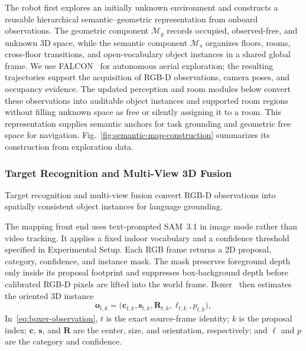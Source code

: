 \documentclass[letterpaper,10pt,journal]{IEEEtran}
\begin{document}
The robot first explores an initially unknown environment and constructs a reusable hierarchical semantic--geometric representation from onboard observations. The geometric component $\mathcal M_g$ records occupied, observed-free, and unknown 3D space, while the semantic component $\mathcal M_s$ organizes floors, rooms, cross-floor transitions, and open-vocabulary object instances in a shared global frame. We use FALCON~\cite{zhang2024falcon} for autonomous aerial exploration; the resulting trajectories support the acquisition of RGB-D observations, camera poses, and occupancy evidence. The updated perception and room modules below convert these observations into auditable object instances and supported room regions without filling unknown space as free or silently assigning it to a room. This representation supplies semantic anchors for task grounding and geometric free space for navigation. Fig.~\ref{fig:semantic-map-construction} summarizes its construction from exploration data.

\subsubsection{Target Recognition and Multi-View 3D Fusion}

Target recognition and multi-view fusion convert RGB-D observations into spatially consistent object instances for language grounding.

The mapping front end uses text-prompted SAM~3.1 in image mode rather than video tracking. It applies a fixed indoor vocabulary and a confidence threshold specified in Experimental Setup. Each RGB frame returns a 2D proposal, category, confidence, and instance mask. The mask preserves foreground depth only inside its proposal footprint and suppresses box-background depth before calibrated RGB-D pixels are lifted into the world frame. Boxer~\cite{detone2026boxer} then estimates the oriented 3D instance
\begin{equation}
\mathbf{o}_{t,k}
=\bigl(\mathbf{c}_{t,k},\mathbf{s}_{t,k},\mathbf{R}_{t,k},
\ell_{t,k},p_{t,k}\bigr),
\label{eq:boxer-observation}
\end{equation}
In~\eqref{eq:boxer-observation}, $t$ is the exact source-frame identity; $k$ is the proposal index; $\mathbf{c}$, $\mathbf{s}$, and $\mathbf{R}$ are the center, size, and orientation, respectively; and $\ell$ and $p$ are the category and confidence.
\end{document}
